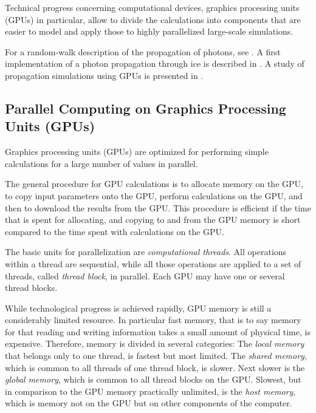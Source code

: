 Technical progress concerning computational devices, graphics processing units (GPUs) in particular, allow to divide the calculations into components that are easier to model and apply those to highly parallelized large-scale simulations.

For a random-walk description of the propagation of photons, see \cite{absorption1997}. A first implementation of a photon propagation through ice is described in \cite{lundberg}. A study of propagation simulations using GPUs is presented in \cite{ppcpaper}.


\subsection{Parallel Computing on Graphics Processing Units (GPUs)}
\label{sec:parallel_computing}

Graphics processing units (GPUs) are optimized for performing simple calculations for a large number of values in parallel.

The general procedure for GPU calculations is to allocate memory on the GPU, to copy input parameters onto the GPU, perform calculations on the GPU, and then to download the results from the GPU. This procedure is efficient if the time that is spent for allocating, and copying to and from the GPU memory is short compared to the time spent with calculations on the GPU. \cite{cudacourse}

The basic units for parallelization are \textit{computational threads}. All operations within a thread are sequential, while all those operations are applied to a set of threads, called \textit{thread block}, in parallel. Each GPU may have one or several thread blocks. \cite{cudacourse}

While technological progress is achieved rapidly, GPU memory is still a considerably limited resource. In particular fast memory, that is to say memory for that reading and writing information takes a small amount of physical time, is expensive. Therefore, memory is divided in several categories: The \textit{local memory} that belongs only to one thread, is fastest but most limited. The \textit{shared memory}, which is common to all threads of one thread block, is slower. Next slower is the \textit{global memory}, which is common to all thread blocks on the GPU. Slowest, but in comparison to the GPU memory practically unlimited, is the \textit{host memory}, which is memory not on the GPU but on other components of the computer. \cite{cudacourse}

